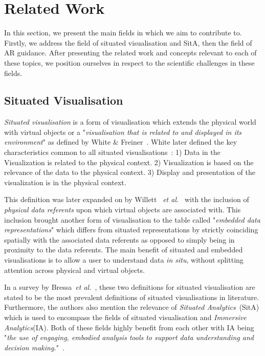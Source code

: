 \section{Related Work}
\label{sota}

In this section, we present the main fields in which we aim to contribute to. 
Firstly, we address the field of situated visualisation and SitA, then the field of AR guidance.
After presenting the related work and concepts relevant to each of these topics, we position ourselves in respect to the scientific challenges in these fields.

\subsection{Situated Visualisation}
\label{situated_visualisation}

\textit{Situated visualisation} is a form of visualisation which extends the physical world with virtual objects or a "\textit{visualisation that is related to and displayed in its environment}" as defined by White \& Freiner~\cite{white2009sitelens}. White later defined the key characteristics common to all situated visualisations~\cite{white2009interaction}: 
1) Data in the Visualization is related to the physical context.
2) Visualization is based on the relevance of the data to the physical context.
3) Display and presentation of the visualization is in the physical context.

This definition was later expanded on by Willett ~\textit{et al.}~\cite{willett2016embedded} with the inclusion of \textit{physical data referents} upon which virtual objects are associated with. This inclusion brought another form of visualisation to the table called "\textit{embedded data representations}" which differs from situated representations by strictly coinciding spatially with the associated data referents as opposed to simply being in proximity to the data referents. 
The main benefit of situated and embedded visualisations is to allow a user to understand data \textit{in situ}, without splitting attention across physical and virtual objects.

In a survey by Bressa~\textit{et al.}~\cite{bressa2021s},
these two definitions for situated visualisation are stated to be the most prevalent definitions of situated visualisations in literature. 
Furthermore, the authors also mention the relevance of \textit{Situated Analytics}~\cite{elsayed2015situated}(SitA) which is used to encompass the fields of situated visualisation and \textit{Immersive Analytics}(IA). Both of these fields highly benefit from each other with IA being "\textit{the use of engaging, embodied analysis tools to support data understanding and decision making.}"~\cite{marriott2018immersive}.


